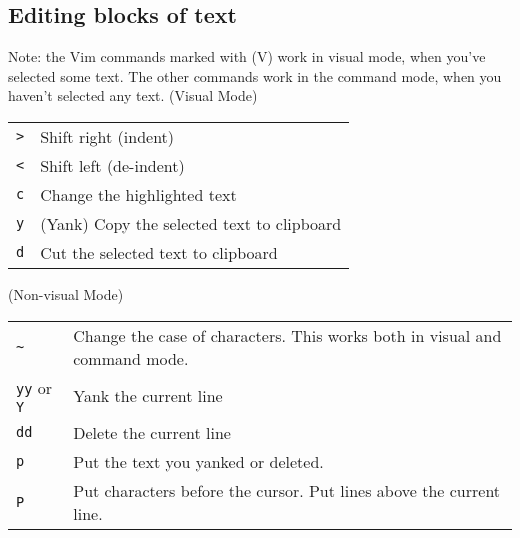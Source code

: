\subsection{Editing blocks of text}
Note: the Vim commands marked with (V) work in visual mode, when you've selected some text. The other commands work in the command mode, when you haven't selected any text.
(Visual Mode)
\begin{tabular}{@{}p{\the\MyLen}%
		  @{}p{\linewidth-\the\MyLen}}
\verb!>! & Shift right (indent)\\
\verb!<! & Shift left (de-indent)\\
\verb!c! & Change the highlighted text\\
\verb!y! & (Yank) Copy the selected text to clipboard\\
\verb!d! & Cut the selected text to clipboard
\end{tabular}

(Non-visual Mode)
\begin{tabular}{@{}p{\the\MyLen}%
		  @{}p{\linewidth-\the\MyLen}}
\verb!~! & Change the case of characters. This works both in visual and command mode.\\
\verb!yy! or \verb!Y! & Yank the current line\\
\verb!dd! & Delete the current line\\
\verb!p!  & Put the text you yanked or deleted.\\
\verb!P!  & Put characters before the cursor. Put lines above the current line.\\
\end{tabular}